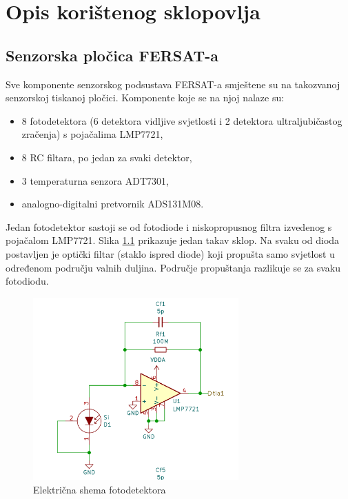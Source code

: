 \chapter{Opis korištenog sklopovlja}
    
    \section{Senzorska pločica FERSAT-a}
        Sve komponente senzorskog podsustava FERSAT-a smještene su na takozvanoj senzorskoj tiskanoj pločici. Komponente koje se na njoj nalaze su:
        \begin{itemize}
            \item 8 fotodetektora (6 detektora vidljive svjetlosti i 2 detektora ultraljubičastog zračenja) s pojačalima LMP7721,
            \item 8 RC filtara, po jedan za svaki detektor,
            \item 3 temperaturna senzora ADT7301,
            \item analogno-digitalni pretvornik ADS131M08.
        \end{itemize}

        Jedan fotodetektor sastoji se od fotodiode i niskopropusnog filtra izvedenog s pojačalom LMP7721. Slika \ref{fig:fotosenzor} prikazuje jedan takav sklop. Na svaku od dioda postavljen je optički filtar (staklo ispred diode) koji propušta samo svjetlost u određenom području valnih duljina. Područje propuštanja razlikuje se za svaku fotodiodu.

        \begin{figure}[h]
            \centering
            \includegraphics[height=7cm]{slike/fotosenzor.png}
            \caption{Električna shema fotodetektora}
            \label{fig:fotosenzor}
        \end{figure}

